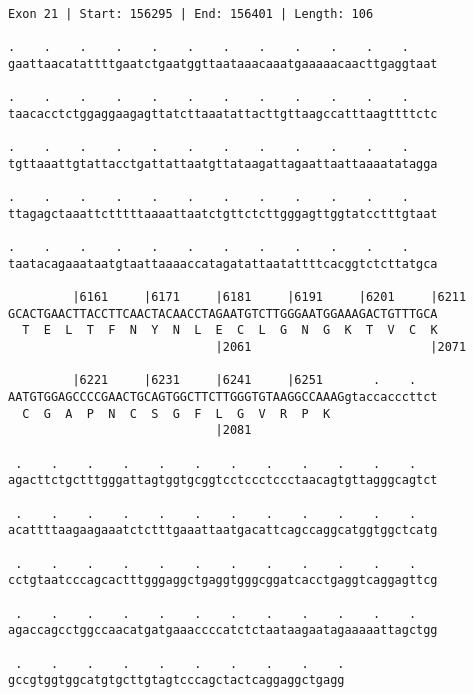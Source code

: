 \documentclass{article}
\begin{document}
\begin{Verbatim}
Exon 21 | Start: 156295 | End: 156401 | Length: 106
 
.    .    .    .    .    .    .    .    .    .    .    .    
gaattaacatattttgaatctgaatggttaataaacaaatgaaaaacaacttgaggtaat
  
.    .    .    .    .    .    .    .    .    .    .    .    
taacacctctggaggaagagttatcttaaatattacttgttaagccatttaagttttctc
  
.    .    .    .    .    .    .    .    .    .    .    .    
tgttaaattgtattacctgattattaatgttataagattagaattaattaaaatatagga
  
.    .    .    .    .    .    .    .    .    .    .    .    
ttagagctaaattctttttaaaattaatctgttctcttgggagttggtatcctttgtaat
  
.    .    .    .    .    .    .    .    .    .    .    .    
taatacagaaataatgtaattaaaaccatagatattaatattttcacggtctcttatgca
  
         |6161     |6171     |6181     |6191     |6201     |6211
GCACTGAACTTACCTTCAACTACAACCTAGAATGTCTTGGGAATGGAAAGACTGTTTGCA
  T  E  L  T  F  N  Y  N  L  E  C  L  G  N  G  K  T  V  C  K
                             |2061                         |2071
  
         |6221     |6231     |6241     |6251       .    .   
AATGTGGAGCCCCGAACTGCAGTGGCTTCTTGGGTGTAAGGCCAAAGgtaccacccttct
  C  G  A  P  N  C  S  G  F  L  G  V  R  P  K               
                             |2081                          
  
 .    .    .    .    .    .    .    .    .    .    .    .   
agacttctgctttgggattagtggtgcggtcctccctccctaacagtgttagggcagtct
  
 .    .    .    .    .    .    .    .    .    .    .    .   
acattttaagaagaaatctctttgaaattaatgacattcagccaggcatggtggctcatg
  
 .    .    .    .    .    .    .    .    .    .    .    .   
cctgtaatcccagcactttgggaggctgaggtgggcggatcacctgaggtcaggagttcg
  
 .    .    .    .    .    .    .    .    .    .    .    .   
agaccagcctggccaacatgatgaaaccccatctctaataagaatagaaaaattagctgg
  
 .    .    .    .    .    .    .    .    .    .
gccgtggtggcatgtgcttgtagtcccagctactcaggaggctgagg
\end{Verbatim}
\newpage
\end{document}
